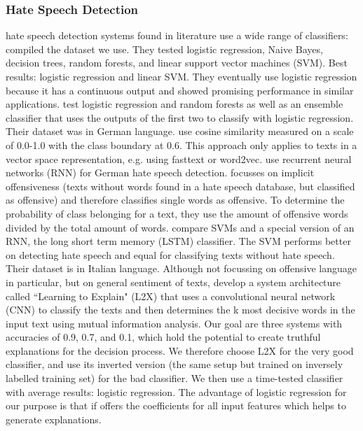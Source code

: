 \subsubsection{Hate Speech Detection}
hate speech detection systems found in literature use a wide range of classifiers: \newline
\cite{davidson2017automated} compiled the dataset we use. They tested logistic regression, Naive Bayes, decision trees, random forests, and linear support vector machines (SVM). Best results: logistic regression and linear SVM. They eventually use logistic regression because it has a continuous output and showed promising performance in similar applications.\newline
\cite{montani2018tuwienkbs} test logistic regression and random forests as well as an ensemble classifier that uses the outputs of the first two to classify with logistic regression. Their dataset was in German language.\newline
\cite{gupta2018proposed} use cosine similarity measured on a scale of 0.0-1.0 with the class boundary at 0.6. This approach only applies to texts in a vector space representation, e.g. using fasttext or word2vec.\newline
\cite{rother2018ulmfit} use recurrent neural networks (RNN) for German hate speech detection.\newline
\cite{klenner2018offensive} focusses on implicit offensiveness (texts without words found in a hate speech database, but classified as offensive) and therefore classifies single words as offensive. To determine the probability of class belonging for a text, they use the amount of offensive words divided by the total amount of words.\newline
\cite{del2017hate} compare SVMs and a special version of an RNN, the long short term memory (LSTM) classifier. The SVM performs better on detecting hate speech and equal for classifying texts without hate speech. Their dataset is in Italian language.\newline
Although not focussing on offensive language in particular, but on general sentiment of texts, \cite{chen2018learning} develop a system architecture called ``Learning to Explain" (L2X) that uses a convolutional neural network (CNN) to classify the texts and then determines the k most decisive words in the input text using mutual information analysis. \medskip \newline
Our goal are three systems with accuracies of 0.9, 0.7, and 0.1, which hold the potential to create truthful explanations for the decision process. We therefore choose L2X for the very good classifier, and use its inverted version (the same setup but trained on inversely labelled training set) for the bad classifier. We then use a time-tested classifier with average results: logistic regression. The advantage of logistic regression for our purpose is that if offers the coefficients for all input features which helps to generate explanations. 

